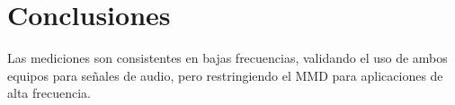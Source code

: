 \documentclass[conference]{IEEEtran}
\begin{document}
\section{Conclusiones}
Las mediciones son consistentes en bajas frecuencias, validando el uso de ambos equipos para señales de audio, pero restringiendo el MMD para aplicaciones de alta frecuencia.


\end{document}
